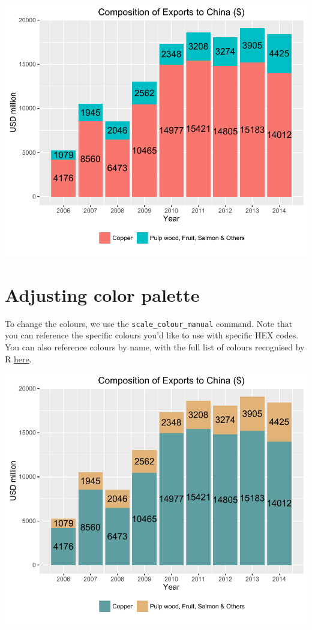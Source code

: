 \begin{center}\includegraphics[width=0.6\linewidth]{3_Bar_Plots_pdf/bar_7-1} \end{center}

\section{Adjusting color palette}\label{adjusting-color-palette}

To change the colours, we use the \texttt{scale\_colour\_manual}
command. Note that you can reference the specific colours you'd like to
use with specific HEX codes. You can also reference colours by name,
with the full list of colours recognised by R
\href{http://www.stat.columbia.edu/~tzheng/files/Rcolor.pdf}{here}.

\begin{Shaded}
\begin{Highlighting}[]
\StringTok{ }\NormalTok{(}\NormalTok{, }\NormalTok{)}
\StringTok{ }\StringTok{ }\NormalTok{(}
\end{Highlighting}
\end{Shaded}

\begin{center}\includegraphics[width=0.6\linewidth]{3_Bar_Plots_pdf/bar_8-1} \end{center}


